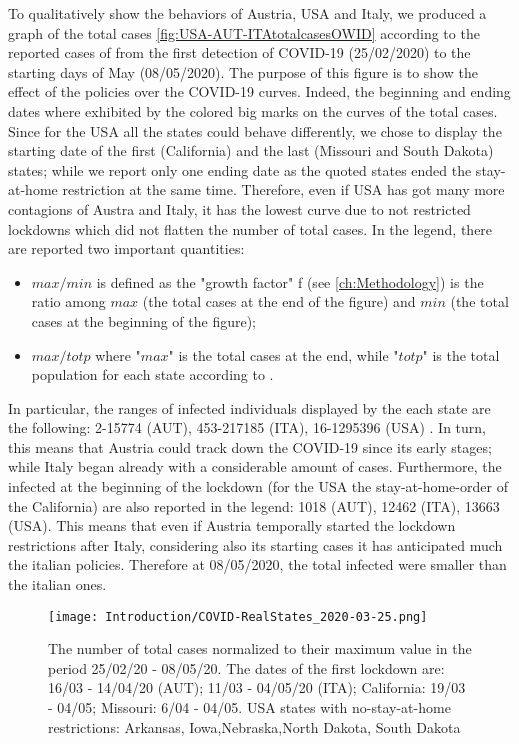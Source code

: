 \documentclass[a4paper,10pt,twoside]{book} %
\theoremstyle{definition}
\begin{document}
To qualitatively show the behaviors of Austria, USA and Italy, we produced a graph of the total cases \autoref{fig:USA-AUT-ITAtotalcasesOWID} according to the reported cases of \cite{JHUGitHub:2020_TotalCases} from the first detection of COVID-19 (25/02/2020) to the starting days of May (08/05/2020). The purpose of this figure is to show the effect of the policies over the COVID-19 curves.
Indeed, the beginning and ending dates where exhibited by the colored big marks on the curves of the total cases. Since for the USA all the states could behave differently, we chose to display the starting date of the first (California) and the last (Missouri and South Dakota) states; while we report only one ending date as the quoted states ended the stay-at-home restriction at the same time.
Therefore, even if USA has got many more contagions of Austra and Italy, it has the lowest curve due to not restricted lockdowns which did not flatten the number of total cases. 
In the legend, there are reported two important quantities:
\begin{itemize}
	\item $max/min$ is defined as the "growth factor" f (see \autoref{ch:Methodology}) is the ratio among $max$ (the total cases at the end of the figure) and $min$ (the total cases at the beginning of the figure);
	\item $max / totp$ where "$max$" is the total cases at the end, while "$totp$" is the total population for each state according to \cite{PopulationEstimate}.
\end{itemize}
In particular, the ranges of infected individuals displayed by the each state are the following: 2-15774 (AUT), 453-217185 (ITA), 16-1295396 (USA) \cite{Anderson:1972_MoreIsDifferent}. In turn, this means that Austria could track down the COVID-19 since its early stages; while Italy began already with a considerable amount of cases. Furthermore, the infected at the beginning of the lockdown (for the USA the stay-at-home-order of the California) are also reported in the legend: 1018 (AUT), 12462 (ITA), 13663 (USA). This means that even if Austria temporally started the lockdown restrictions after Italy, considering also its starting cases it has anticipated much the italian policies. Therefore at 08/05/2020, the total infected were smaller than the italian ones.
\begin{figure}[tbp]
	\centering
	\texttt{[image: Introduction/COVID-RealStates\_2020-03-25.png]}
	\caption{The number of total cases normalized to their maximum value in the period 25/02/20 - 08/05/20. The dates of the first lockdown are: 16/03 - 14/04/20 (AUT); 11/03 - 04/05/20 (ITA); California: 19/03 - 04/05; Missouri: 6/04 - 04/05. USA states with no-stay-at-home restrictions: Arkansas,	Iowa,Nebraska,North Dakota,	South Dakota}
	\label{fig:USA-AUT-ITAtotalcasesOWID}
\end{figure}
\end{document}
